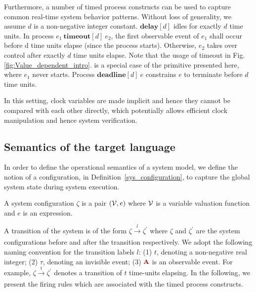 \documentclass[acmsmall,10pt,review]{acmart}
\newcommand{\env}{\code{\mathcal{V}}}
\newcommand{\anyevent}[1]{{\textcolor{darkred}
{{\textbf{\small #1}}}}}
\newcommand{\code}[1]{{\tt{\ensuremath{\m{#1}}}}}
\newcommand{\m}{\mathit}
\newcommand\figref[1]{Fig. \textcolor{black}{\ref{#1}}.}
\newcommand\defref[1]{Definition~\textcolor{blue}{\ref{#1}}}
\begin{document}
{Furthermore, a number of timed process constructs can be used to capture common 
real-time system behavior patterns. Without loss of generality, we 
assume \code{d} is a non-negative integer constant.  
$\textbf{delay} [d]$ idles for exactly $d$ 
time units.
 In process $e_1\ \textbf{timeout} [d]\ e_2$, the first observable event of 
$e_1$ shall occur before d time units elapse (since the process starts). 
Otherwise, $e_2$ takes over control after exactly $d$ time units elapse. 
Note that the usage of timeout in \figref{fig:Value_dependent_intro} is a 
special case of the primitive presented here, where \code{e_1} never starts. 
Process $\textbf{deadline} [d]\ e$ constrains $e$ to terminate before $d$ time units. 


In this setting, clock variables are 
made implicit and hence they cannot be compared with each other 
directly, which potentially allows efficient clock manipulation and 
hence system verification.


%

\subsection{Semantics of the target language}
\label{subsec:Targetlanguage_Semantics}

In order to define the operational semantics of a system model, 
we define the notion of a configuration, in \defref{sys_configuration}, to capture 
the global system state during system execution.

\begin{definition}\label{sys_configuration}
A system configuration \code{\zeta} is a pair $(\env , e)$ where $\env$ is a variable valuation function and $e$ is an expression.
\end{definition}

A transition of the system is of the form $\zeta \xrightarrow[]{l} \zeta^\prime$ 
where $\zeta$ and $\zeta^\prime$ are 
the system configurations before and after the transition respectively. 
We adopt the following naming convention \cite{DBLP:conf/icfem/SunLDZ09} for the transition labels \code{l}: 
(1) $t$, denoting a non-negative real integer; 
(2) $\tau$, denoting an invisible event; %
(3) $\anyevent{A}$ is an observable event. 
For example, $\zeta \xrightarrow[]{\text{t}} \zeta^\prime$ denotes a transition 
of \code{t} time-units elapsing. 
In the following, we present the firing rules which are associated with 
the timed process constructs. 

}
\end{document}
